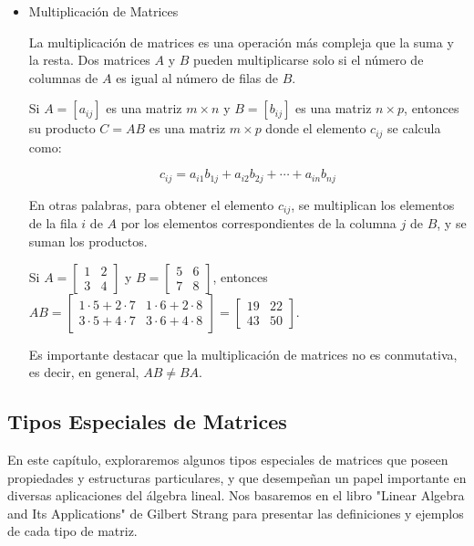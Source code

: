 \begin{itemize}
	\item Multiplicación de Matrices
	
	La multiplicación de matrices es una operación más compleja que la suma y la resta.  Dos matrices $A$ y $B$ pueden multiplicarse solo si el número de columnas de $A$ es igual al número de filas de $B$.
	
	Si $A = [a_{ij}]$ es una matriz $m \times n$ y $B = [b_{ij}]$ es una matriz $n \times p$, entonces su producto $C = AB$ es una matriz $m \times p$ donde el elemento $c_{ij}$ se calcula como:
	
	\begin{equation*}
		c_{ij} = a_{i1}b_{1j} + a_{i2}b_{2j} + \cdots + a_{in}b_{nj} 
	\end{equation*}
	
	En otras palabras, para obtener el elemento $c_{ij}$, se multiplican los elementos de la fila $i$ de $A$ por los elementos correspondientes de la columna $j$ de $B$, y se suman los productos.
	
	\begin{example}
		Si $A = \begin{bmatrix} 1 & 2 \\ 3 & 4 \end{bmatrix}$ y $B = \begin{bmatrix} 5 & 6 \\ 7 & 8 \end{bmatrix}$, entonces 
		$AB = \begin{bmatrix} 1 \cdot 5 + 2 \cdot 7 & 1 \cdot 6 + 2 \cdot 8 \\ 3 \cdot 5 + 4 \cdot 7 & 3 \cdot 6 + 4 \cdot 8 \end{bmatrix} = \begin{bmatrix} 19 & 22 \\ 43 & 50 \end{bmatrix}$.
	\end{example}
	
	Es importante destacar que la multiplicación de matrices no es conmutativa, es decir, en general, $AB \neq BA$.
\end{itemize}

\subsection{Tipos Especiales de Matrices}

En este capítulo, exploraremos algunos tipos especiales de matrices que poseen propiedades y estructuras particulares, y que desempeñan un papel importante en diversas aplicaciones del álgebra lineal.  Nos basaremos en el libro "Linear Algebra and Its Applications" de Gilbert Strang para presentar las definiciones y ejemplos de cada tipo de matriz.


